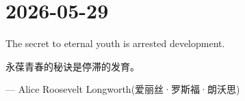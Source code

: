 \section*{2026-05-29}
The secret to eternal youth is arrested development. \par
永葆青春的秘诀是停滞的发育。 \par
\hfill --- Alice Roosevelt Longworth(爱丽丝·罗斯福·朗沃思) \par
